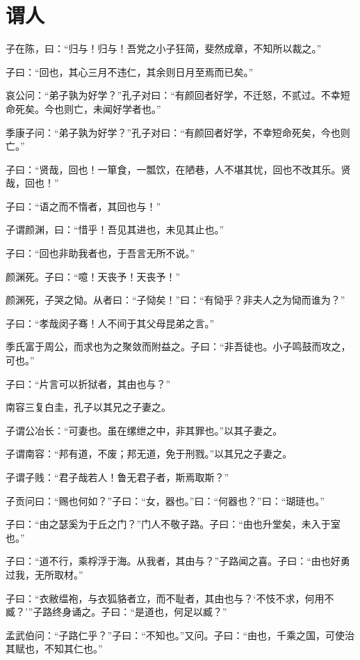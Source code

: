 \documentclass[a5paper]{ctexbook}
\begin{document}
    \chapter{谓人}

    子在陈，曰：“归与！归与！吾党之小子狂简，斐然成章，不知所以裁之。”

    子曰：“回也，其心三月不违仁，其余则日月至焉而已矣。”

    哀公问：“弟子孰为好学？”孔子对曰：“有颜回者好学，不迁怒，不贰过。不幸短命死矣。今也则亡，未闻好学者也。”

    季康子问：“弟子孰为好学？”孔子对曰：“有颜回者好学，不幸短命死矣，今也则亡。”

    子曰：“贤哉，回也！一箪食，一瓢饮，在陋巷，人不堪其忧，回也不改其乐。贤哉，回也！”

    子曰：“语之而不惰者，其回也与！”

    子谓颜渊，曰：“惜乎！吾见其进也，未见其止也。”

    子曰：“回也非助我者也，于吾言无所不说。”

    颜渊死。子曰：“噫！天丧予！天丧予！”

    颜渊死，子哭之恸。从者曰：“子恸矣！”曰：“有恸乎？非夫人之为恸而谁为？”

    子曰：“孝哉闵子骞！人不间于其父母昆弟之言。”

    季氏富于周公，而求也为之聚敛而附益之。子曰：“非吾徒也。小子鸣鼓而攻之，可也。”

    子曰：“片言可以折狱者，其由也与？”

    南容三复白圭，孔子以其兄之子妻之。

    子谓公冶长：“可妻也。虽在缧绁之中，非其罪也。”以其子妻之。

    子谓南容：“邦有道，不废；邦无道，免于刑戮。”以其兄之子妻之。

    子谓子贱：“君子哉若人！鲁无君子者，斯焉取斯？”

    子贡问曰：“赐也何如？”子曰：“女，器也。”曰：“何器也？”曰：“瑚琏也。”

    子曰：“由之瑟奚为于丘之门？”门人不敬子路。子曰：“由也升堂矣，未入于室也。”

    子曰：“道不行，乘桴浮于海。从我者，其由与？”子路闻之喜。子曰：“由也好勇过我，无所取材。”

    子曰：“衣敝缊袍，与衣狐貉者立，而不耻者，其由也与？‘不忮不求，何用不臧？’”子路终身诵之。子曰：“是道也，何足以臧？”

    孟武伯问：“子路仁乎？”子曰：“不知也。”又问。子曰：“由也，千乘之国，可使治其赋也，不知其仁也。”
    
\end{document}
